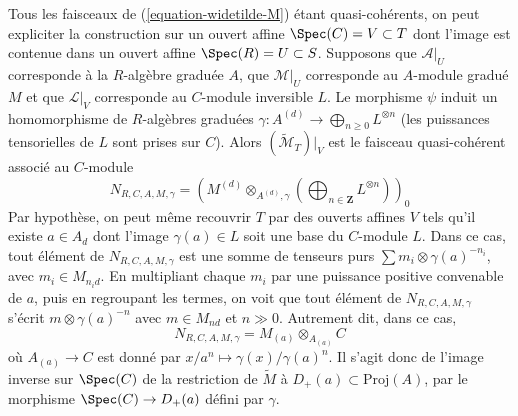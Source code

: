 \medskip\noindent
Tous les faisceaux de (\ref{equation-widetilde-M}) étant quasi-cohérents,
on peut expliciter la construction sur un ouvert affine
$\Spec(C) = V \subset T$ dont l'image est contenue dans un ouvert affine
$\Spec(R) = U \subset S$. Supposons que $\mathcal{A}|_U$ corresponde à la
$R$-algèbre graduée $A$, que $\mathcal{M}|_U$ corresponde au $A$-module
gradué $M$ et que $\mathcal{L}|_V$ corresponde au $C$-module inversible $L$.
Le morphisme $\psi$ induit un homomorphisme de $R$-algèbres graduées
$\gamma : A^{(d)} \to \bigoplus_{n \geq 0} L^{\otimes n}$
(les puissances tensorielles de $L$ sont prises sur $C$).
Alors $(\widetilde{\mathcal{M}}_T)|_V$ est le faisceau quasi-cohérent
associé au $C$-module
$$
N_{R, C, A, M, \gamma} =
\left(
M^{(d)} \otimes_{A^{(d)}, \gamma}
\left(\bigoplus\nolimits_{n \in \mathbf{Z}} L^{\otimes n}\right)
\right)_0
$$
Par hypothèse, on peut même recouvrir $T$ par des ouverts affines $V$ tels
qu'il existe $a \in A_d$ dont l'image $\gamma(a) \in L$ soit une base du
$C$-module $L$. Dans ce cas, tout élément de $N_{R, C, A, M, \gamma}$ est
une somme de tenseurs purs $\sum m_i \otimes \gamma(a)^{-n_i}$, avec
$m_i \in M_{n_id}$. En multipliant chaque $m_i$ par une puissance positive
convenable de $a$, puis en regroupant les termes, on voit que tout élément
de $N_{R, C, A, M, \gamma}$ s'écrit $m \otimes \gamma(a)^{-n}$ avec
$m \in M_{nd}$ et $n \gg 0$. Autrement dit, dans ce cas,
$$
N_{R, C, A, M, \gamma} = M_{(a)} \otimes_{A_{(a)}} C
$$
où $A_{(a)} \to C$ est donné par
$x/a^n \mapsto \gamma(x)/\gamma(a)^n$.
Il s'agit donc de l'image inverse sur $\Spec(C)$ de la restriction de
$\widetilde{M}$ à $D_{+}(a) \subset \text{Proj}(A)$, par le morphisme
$\Spec(C) \to D_{+}(a)$ défini par $\gamma$.

